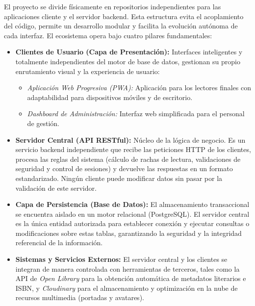 \documentclass[12pt, atypical, journal]{article}
\begin{document}
El proyecto se divide físicamente en repositorios independientes para las aplicaciones cliente y el servidor backend. Esta estructura evita el acoplamiento del código, permite un desarrollo modular y facilita la evolución autónoma de cada interfaz. El ecosistema opera bajo cuatro pilares fundamentales:

\begin{itemize}
    \item \textbf{Clientes de Usuario (Capa de Presentación):} Interfaces inteligentes y totalmente independientes del motor de base de datos, gestionan su propio enrutamiento visual y la experiencia de usuario:
    \begin{itemize}
        \item \textit{Aplicación Web Progresiva (PWA):} Aplicación para los lectores finales con adaptabilidad para dispositivos móviles y de escritorio.
        \item \textit{Dashboard de Administración:} Interfaz web simplificada para el personal de gestión.
    \end{itemize}
    
    \item \textbf{Servidor Central (API RESTful):} Núcleo de la lógica de negocio. Es un servicio backend independiente que recibe las peticiones HTTP de los clientes, procesa las reglas del sistema (cálculo de rachas de lectura, validaciones de seguridad y control de sesiones) y devuelve las respuestas en un formato estandarizado. Ningún cliente puede modificar datos sin pasar por la validación de este servidor.
    
    \item \textbf{Capa de Persistencia (Base de Datos):} El almacenamiento transaccional se encuentra aislado en un motor relacional (PostgreSQL). El servidor central es la única entidad autorizada para establecer conexión y ejecutar consultas o modificaciones sobre estas tablas, garantizando la seguridad y la integridad referencial de la información.
    
    \item \textbf{Sistemas y Servicios Externos:} El servidor central y los clientes se integran de manera controlada con herramientas de terceros, tales como la API de \textit{Open Library} para la obtención automática de metadatos literarios e ISBN, y \textit{Cloudinary} para el almacenamiento y optimización en la nube de recursos multimedia (portadas y avatares).
\end{itemize}
\end{document}
